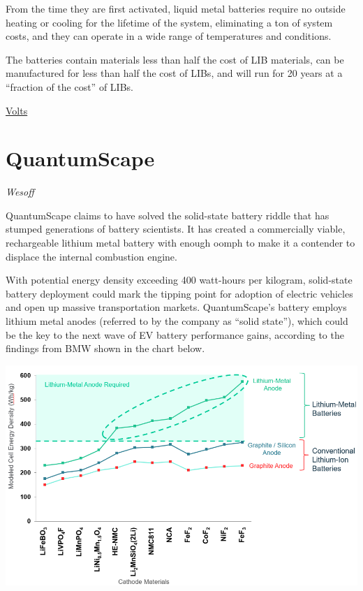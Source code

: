 \documentclass[
]{book}
\begin{document}
From the time they are first activated, liquid metal batteries require no outside heating or cooling for the lifetime of the system, eliminating a ton of system costs, and they can operate in a wide range of temperatures and conditions.

The batteries contain materials less than half the cost of LIB materials, can be manufactured for less than half the cost of LIBs, and will run for 20 years at a ``fraction of the cost'' of LIBs.

\href{https://www.volts.wtf/p/battery-week-competitors-to-lithium}{Volts}

\hypertarget{quantumscape}{%
\section{QuantumScape}\label{quantumscape}}

\emph{Wesoff}

QuantumScape claims to have solved the solid-state battery riddle that has stumped generations of battery scientists. It has created a commercially viable, rechargeable lithium metal battery with enough oomph to make it a contender to displace the internal combustion engine.

With potential energy density exceeding 400 watt-hours per kilogram, solid-state battery deployment could mark the tipping point for adoption of electric vehicles and open up massive transportation markets. QuantumScape's battery employs lithium metal anodes (referred to by the company as ``solid state''), which could be the key to the next wave of EV battery performance gains, according to the findings from BMW shown in the chart below.

\includegraphics{fig/cathode-anode-materials-chart.png}
\end{document}
